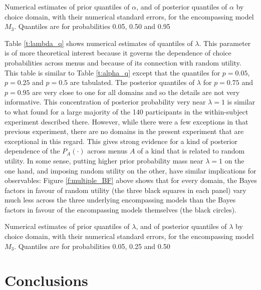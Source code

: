 \documentclass[11pt,letter]{article}
\newcommand{\menus}{menus}
\begin{document}
\begin{table}
  
  \caption{Numerical estimates of prior quantiles of $\alpha$, and of posterior quantiles of $\alpha$ by choice domain, with their numerical standard errors, for the encompassing model $M_3$. Quantiles are for probabilities 0.05, 0.50 and 0.95}
  \label{t:alpha_q}
\end{table}

Table \ref{t:lambda_q} shows numerical estimates of quantiles of $\lambda$.
This parameter is of more theoretical interest because it governs the dependence of choice probabilities across \menus{} and because of its connection with random utility.
This table is similar to Table \ref{t:alpha_q} except that the quantiles for $p=0.05$, $p=0.25$ and $p=0.5$ are tabulated.
The posterior quantiles of $\lambda$ for $p=0.75$ and $p=0.95$ are very close to one for all domains and so the details are not very informative.
This concentration of posterior probability very near $\lambda = 1$ is similar to what  found for a large majority of the 140 participants in the within-subject experiment described there.
However, while there were a few exceptions in that previous experiment, there are no domains in the present experiment that are exceptional in this regard.
This gives strong evidence for a kind of posterior dependence of the $P_A(\cdot)$ across \menus{} $A$ of a kind that is related to random utility.
In some sense, putting higher prior probability mass near $\lambda = 1$ on the one hand, and imposing random utility on the other, have similar implications for observables: Figure \ref{f:multiple_BF} above shows that for every domain, the Bayes factors in favour of random utility (the three black squares in each panel) vary much less across the three underlying encompassing models than the Bayes factors in favour of the encompassing models themselves (the black circles).

\begin{table}
  
  \caption{Numerical estimates of prior quantiles of $\lambda$, and of posterior quantiles of $\lambda$ by choice domain, with their numerical standard errors, for the encompassing model $M_3$. Quantiles are for probabilities 0.05, 0.25 and 0.50}
  \label{t:lambda_q}
\end{table}

\section{Conclusions}\label{s:conclude}
\end{document}
